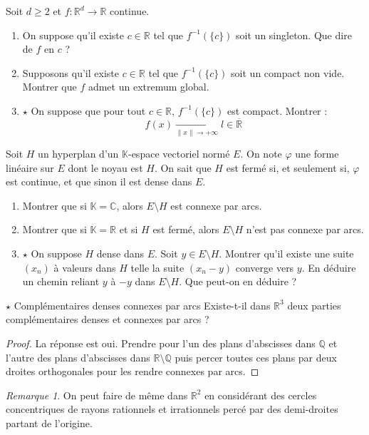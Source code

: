 \documentclass[french,a4paper]{article}
\newcommand{\Q}{\mathbb{Q}}
\newcommand{\R}{\mathbb{R}}
\newcommand{\C}{\mathbb{C}}
\newcommand{\K}{\mathbb{K}}
\newcommand{\inv}{^{-1}}
\theoremstyle{plain}
\theoremstyle{definition}
\theoremstyle{remark}
\newtheorem*{rmq}{Remarque}
\begin{document}
\begin{ex}{}
	Soit $d\geqslant 2$ et $f:\R^d\to\R$ continue.
	\begin{enumerate}
		\item On suppose qu'il existe $c\in\R$ tel que $f\inv(\{c\})$ soit un singleton. Que dire de $f$ en $c$ ?
		\item Supposons qu'il existe $c\in\R$ tel que $f\inv(\{c\})$ soit un compact non vide. Montrer que $f$ admet un extremum global.
		\item $\star$ On suppose que pour tout $c\in\R$, $f\inv(\{c\})$ est compact. Montrer : $$f(x)\xrightarrow[\lVert x\rVert\to+\infty]{}l\in\overline{\R}$$
	\end{enumerate}
\end{ex}

\begin{ex}{}
	Soit $H$ un hyperplan d'un $\K$-espace vectoriel normé $E$. On note $\varphi$ une forme linéaire sur $E$ dont le noyau est $H$. On sait que $H$ est fermé si, et seulement si, $\varphi$ est continue, et que sinon il est dense dans $E$.
	\begin{enumerate}
		\item Montrer que si $\K=\C$, alors $E\setminus H$ est connexe par arcs.
		\item Montrer que si $\K=\R$ et si $H$ est fermé, alors $E\setminus H$ n'est pas connexe par arcs.
		\item $\star$ On suppose $H$ dense dans $E$. Soit $y\in E\setminus H$. Montrer qu'il existe une suite $(x_n)$ à valeurs dans $H$ telle la suite $(x_n-y)$ converge vers $y$. En déduire un chemin reliant $y$ à $-y$ dans $E\setminus H$. Que peut-on en déduire ?
	\end{enumerate}
\end{ex}

\begin{ex}{$\star$ Complémentaires denses connexes par arcs}
	Existe-t-il dans $\R^3$ deux parties complémentaires denses et connexes par arcs ?
\end{ex}
\begin{proof}
	La réponse est oui. Prendre pour l'un des plans d'abscisses dans $\Q$ et l'autre des plans d'abscisses dans $\R\setminus\Q$ puis percer toutes ces plans par deux droites orthogonales pour les rendre connexes par arcs.
\end{proof}
\begin{rmq}
	On peut faire de même dans $\R^2$ en considérant des cercles concentriques de rayons rationnels et irrationnels percé par des demi-droites partant de l'origine.
\end{rmq}
\end{document}
